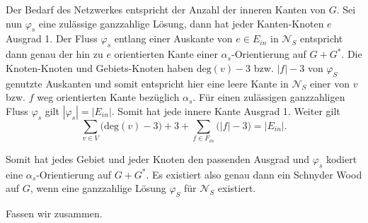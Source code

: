 Der Bedarf des Netzwerkes entspricht der Anzahl der inneren Kanten von $G$. Sei nun $\varphi_s$ eine zulässige ganzzahlige Lösung, dann hat jeder Kanten-Knoten $e$ Ausgrad 1. Der Fluss $\varphi_s$ entlang einer Auskante von $e \in E_{in}$ in $\mathcal{N}_S$ entspricht dann genau der hin zu $e$ orientierten Kante einer $\alpha_{s}$-Orientierung auf $G+G^*$. Die Knoten-Knoten und Gebiets-Knoten haben $\text{deg}(v)-3$ bzw. $|f|-3$ von $\varphi_S$ genutzte Auskanten und somit entspricht hier eine leere Kante in $\mathcal{N}_S$ einer von $v$ bzw. $f$ weg orientierten Kante bezüglich $\alpha_{s}$. Für einen zulässigen ganzzahligen Fluss $\varphi_s$ gilt $|\varphi_s| = |E_{in}|$. Somit hat jede innere Kante Ausgrad 1. Weiter gilt 
$$\sum_{v \in V} \Big(\text{deg}(v)-3\Big) + 3 + \sum_{f \in F_{in}} \Big(|f|-3\Big) = |E_{in}|.$$

Somit hat jedes Gebiet und jeder Knoten den passenden Ausgrad und $\varphi_s$ kodiert eine $\alpha_s$-Orientierung auf $G+G^*$. Es existiert also genau dann ein Schnyder Wood auf $G$, wenn eine ganzzahlige Lösung $\varphi_S$ für $\mathcal{N}_S$ existiert.

Fassen wir zusammen.


